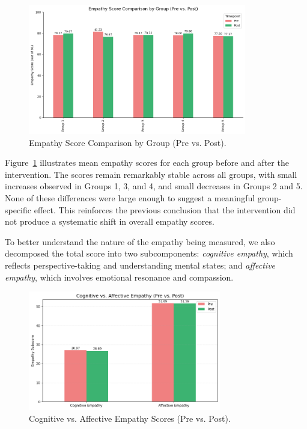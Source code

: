 \begin{figure}[htbp]
    \centering
    \includegraphics[width=0.85\textwidth]{../../Figures/emph-scores-comp-grp.png}
    \caption{Empathy Score Comparison by Group (Pre vs. Post).}
    \label{fig:empathy_group_bar}
\end{figure}

Figure~\ref{fig:empathy_group_bar} illustrates mean empathy scores for each group before and after the intervention. The scores remain remarkably stable across all groups, with small increases observed in Groups 1, 3, and 4, and small decreases in Groups 2 and 5. None of these differences were large enough to suggest a meaningful group-specific effect. This reinforces the previous conclusion that the intervention did not produce a systematic shift in overall empathy scores.

To better understand the nature of the empathy being measured, we also decomposed the total score into two subcomponents: \textit{cognitive empathy}, which reflects perspective-taking and understanding mental states; and \textit{affective empathy}, which involves emotional resonance and compassion.

\begin{figure}[htbp]
    \centering
    \includegraphics[width=0.75\textwidth]{../../Figures/cog-vs-affect.png}
    \caption{Cognitive vs. Affective Empathy Scores (Pre vs. Post).}
    \label{fig:empathy_cog_aff}
\end{figure}


